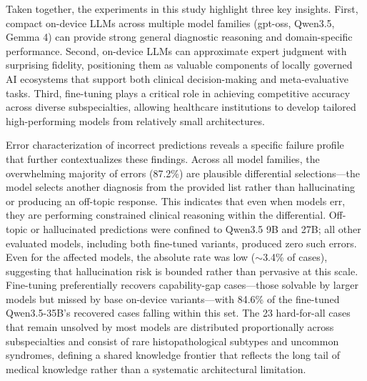 \documentclass[10pt,journal,compsoc, onecolumn]{IEEEtran}
\begin{document}
Taken together, the experiments in this study highlight three key insights. First, compact on-device LLMs across multiple model families (gpt-oss, Qwen3.5, Gemma 4) can provide strong general diagnostic reasoning and domain-specific performance. Second, on-device LLMs can approximate expert judgment with surprising fidelity, positioning them as valuable components of locally governed AI ecosystems that support both clinical decision-making and meta-evaluative tasks. Third, fine-tuning plays a critical role in achieving competitive accuracy across diverse subspecialties, allowing healthcare institutions to develop tailored high-performing models from relatively small architectures.

Error characterization of incorrect predictions reveals a specific failure profile that further contextualizes these findings. Across all model families, the overwhelming majority of errors (87.2\%) are plausible differential selections---the model selects another diagnosis from the provided list rather than hallucinating or producing an off-topic response. This indicates that even when models err, they are performing constrained clinical reasoning within the differential. Off-topic or hallucinated predictions were confined to Qwen3.5 9B and 27B; all other evaluated models, including both fine-tuned variants, produced zero such errors. Even for the affected models, the absolute rate was low ($\sim$3.4\% of cases), suggesting that hallucination risk is bounded rather than pervasive at this scale. Fine-tuning preferentially recovers capability-gap cases---those solvable by larger models but missed by base on-device variants---with 84.6\% of the fine-tuned Qwen3.5-35B's recovered cases falling within this set. The 23 hard-for-all cases that remain unsolved by most models are distributed proportionally across subspecialties and consist of rare histopathological subtypes and uncommon syndromes, defining a shared knowledge frontier that reflects the long tail of medical knowledge rather than a systematic architectural limitation.
\end{document}
